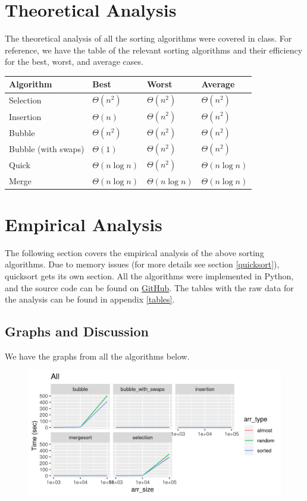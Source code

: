 \documentclass[letterpaper, 11pt]{article}
\begin{document}
\section{Theoretical Analysis}
The theoretical analysis of all the sorting algorithms were covered in class.
For reference, we have the table of the relevant sorting algorithms and their
efficiency for the best, worst, and average cases. 

\begin{center}
\begin{tabular}{l | l l l}
  Algorithm & Best  & Worst  & Average  \\
  \hline
  Selection & \(\Theta(n^2)\) & \(\Theta(n^2)\) & \(\Theta(n^2)\) \\
  Insertion & \(\Theta(n)\) & \(\Theta(n^2)\) & \(\Theta(n^2)\) \\
  Bubble & \(\Theta(n^2)\) & \(\Theta(n^2)\) & \(\Theta(n^2)\) \\
  Bubble (with swaps) & \(\Theta(1)\) & \(\Theta(n^2)\) & \(\Theta(n^2)\) \\
  Quick & \(\Theta(n \log n)\) & \(\Theta(n^2)\) & \(\Theta(n\log n)\) \\
  Merge & \(\Theta(n \log n)\) & \(\Theta(n\log n)\) & \(\Theta(n\log n)\) \\
\end{tabular}
\end{center}

\section{Empirical Analysis}
The following section covers the empirical analysis of the above sorting
algorithms. Due to memory issues (for more details see section
\ref{quicksort}), quicksort gets its own section. All the algorithms were
implemented in Python, and the source code can be found on
\href{https://github.com/gwallace04/cs3130/blob/master/projects/proj2/proj2.py}
{GitHub}. The tables with the raw data for the analysis can be found in
appendix \ref{tables}.

\subsection{Graphs and Discussion}
We have the graphs from all the algorithms below.
\begin{figure}[h]
  \includegraphics[width=\linewidth]{all.png}
\end{figure}
\end{document}
